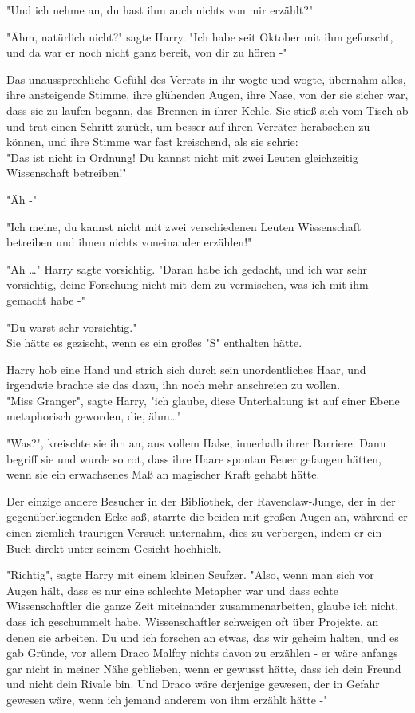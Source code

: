 {"Und ich nehme an, du hast ihm auch nichts von mir erzählt?"

"Ähm, natürlich nicht?" sagte Harry. "Ich habe seit Oktober mit ihm geforscht, und da war er noch nicht ganz bereit, von dir zu hören -"

Das unaussprechliche Gefühl des Verrats in ihr wogte und wogte, übernahm alles, ihre ansteigende Stimme, ihre glühenden Augen, ihre Nase, von der sie sicher war, dass sie zu laufen begann, das Brennen in ihrer Kehle. Sie stieß sich vom Tisch ab und trat einen Schritt zurück, um besser auf ihren Verräter herabsehen zu können, und ihre Stimme war fast kreischend, als sie schrie:\\ "Das ist nicht in Ordnung! Du kannst nicht mit zwei Leuten gleichzeitig Wissenschaft betreiben!"

"Äh -"

"Ich meine, du kannst nicht mit zwei verschiedenen Leuten Wissenschaft betreiben und ihnen nichts voneinander erzählen!"

"Ah …" Harry sagte vorsichtig. "Daran habe ich gedacht, und ich war sehr vorsichtig, deine Forschung nicht mit dem zu vermischen, was ich mit ihm gemacht habe -"

"Du warst sehr vorsichtig."\\ Sie hätte es gezischt, wenn es ein großes "S" enthalten hätte.

Harry hob eine Hand und strich sich durch sein unordentliches Haar, und irgendwie brachte sie das dazu, ihn noch mehr anschreien zu wollen.\\ "Miss Granger", sagte Harry, "ich glaube, diese Unterhaltung ist auf einer Ebene metaphorisch geworden, die, ähm…"

"Was?", kreischte sie ihn an, aus vollem Halse, innerhalb ihrer Barriere. Dann begriff sie und wurde so rot, dass ihre Haare spontan Feuer gefangen hätten, wenn sie ein erwachsenes Maß an magischer Kraft gehabt hätte.

Der einzige andere Besucher in der Bibliothek, der Ravenclaw-Junge, der in der gegenüberliegenden Ecke saß, starrte die beiden mit großen Augen an, während er einen ziemlich traurigen Versuch unternahm, dies zu verbergen, indem er ein Buch direkt unter seinem Gesicht hochhielt.

"Richtig", sagte Harry mit einem kleinen Seufzer. "Also, wenn man sich vor Augen hält, dass es nur eine schlechte Metapher war und dass echte Wissenschaftler die ganze Zeit miteinander zusammenarbeiten, glaube ich nicht, dass ich geschummelt habe. Wissenschaftler schweigen oft über Projekte, an denen sie arbeiten. Du und ich forschen an etwas, das wir geheim halten, und es gab Gründe, vor allem Draco Malfoy nichts davon zu erzählen - er wäre anfangs gar nicht in meiner Nähe geblieben, wenn er gewusst hätte, dass ich dein Freund und nicht dein Rivale bin. Und Draco wäre derjenige gewesen, der in Gefahr gewesen wäre, wenn ich jemand anderem von ihm erzählt hätte -"

}
